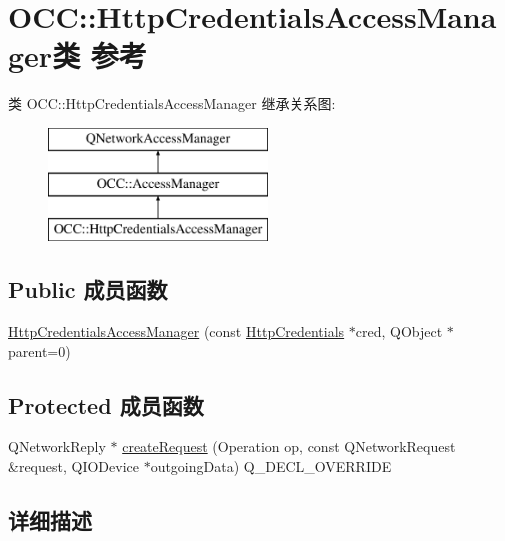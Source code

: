 \hypertarget{class_o_c_c_1_1_http_credentials_access_manager}{}\section{O\+CC\+:\+:Http\+Credentials\+Access\+Manager类 参考}
\label{class_o_c_c_1_1_http_credentials_access_manager}
类 O\+CC\+:\+:Http\+Credentials\+Access\+Manager 继承关系图\+:\begin{figure}[H]
\begin{center}
\leavevmode
\includegraphics[height=3.000000cm]{class_o_c_c_1_1_http_credentials_access_manager}
\end{center}
\end{figure}
\subsection*{Public 成员函数}
\begin{DoxyCompactItemize}
\item 
\hyperlink{class_o_c_c_1_1_http_credentials_access_manager_aa167727a38f729cb86070410c0de32ad}{Http\+Credentials\+Access\+Manager} (const \hyperlink{class_o_c_c_1_1_http_credentials}{Http\+Credentials} $\ast$cred, Q\+Object $\ast$parent=0)
\end{DoxyCompactItemize}
\subsection*{Protected 成员函数}
\begin{DoxyCompactItemize}
\item 
Q\+Network\+Reply $\ast$ \hyperlink{class_o_c_c_1_1_http_credentials_access_manager_a8cdf2b768c186686707dfdadf32961f1}{create\+Request} (Operation op, const Q\+Network\+Request \&request, Q\+I\+O\+Device $\ast$outgoing\+Data) Q\+\_\+\+D\+E\+C\+L\+\_\+\+O\+V\+E\+R\+R\+I\+DE
\end{DoxyCompactItemize}


\subsection{详细描述}



